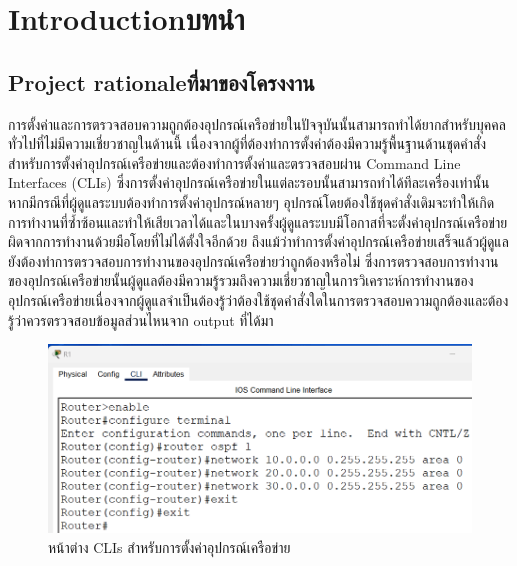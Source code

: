 \chapter{\ifenglish Introduction\else บทนำ\fi}

\section{\ifenglish Project rationale\else ที่มาของโครงงาน\fi}
\hspace{0.5in}
การตั้งค่าและการตรวจสอบความถูกต้องอุปกรณ์เครือข่ายในปัจจุบันนั้นสามารถทำได้ยากสำหรับบุคคลทั่วไปที่ไม่มีความเชี่ยวชาญในด้านนี้ เนื่องจากผู้ที่ต้องทำการตั้งค่าต้องมีความรู้พื้นฐานด้านชุดคำสั่งสำหรับการตั้งค่าอุปกรณ์เครือข่ายและต้องทำการตั้งค่าและตรวจสอบผ่าน Command Line Interfaces (CLIs) ซึ่งการตั้งค่าอุปกรณ์เครือข่ายในแต่ละรอบนั้นสามารถทำได้ทีละเครื่องเท่านั้น หากมีกรณีที่ผู้ดูแลระบบต้องทำการตั้งค่าอุปกรณ์หลายๆ อุปกรณ์โดยต้องใช้ชุดคำสั่งเดิมจะทำให้เกิดการทำงานที่ซ้ำซ้อนและทำให้เสียเวลาได้และในบางครั้งผู้ดูแลระบบมีโอกาสที่จะตั้งค่าอุปกรณ์เครือข่ายผิดจากการทำงานด้วยมือโดยที่ไม่ได้ตั้งใจอีกด้วย
ถึงแม้ว่าทำการตั้งค่าอุปกรณ์เครือข่ายเสร็จแล้วผู้ดูแลยังต้องทำการตรวจสอบการทำงานของอุปกรณ์เครือข่ายว่าถูกต้องหรือไม่ ซึ่งการตรวจสอบการทำงานของอุปกรณ์เครือข่ายนั้นผู้ดูแลต้องมีความรู้รวมถึงความเชี่ยวชาญในการวิเคราะห์การทำงานของอุปกรณ์เครือข่ายเนื่องจากผู้ดูแลจำเป็นต้องรู้ว่าต้องใช้ชุดคำสั่งใดในการตรวจสอบความถูกต้องและต้องรู้ว่าควรตรวจสอบข้อมูลส่วนไหนจาก output ที่ได้มา


\begin{figure}[h]
    \begin{center}
      \includegraphics[scale=0.3]{RouterConf.png}
    \end{center}
    \caption[หน้าต่าง CLIs สำหรับการตั้งค่าอุปกรณ์เครือข่าย]{หน้าต่าง CLIs สำหรับการตั้งค่าอุปกรณ์เครือข่าย}
    \label{fig:RouterCLIs}
  \end{figure}

